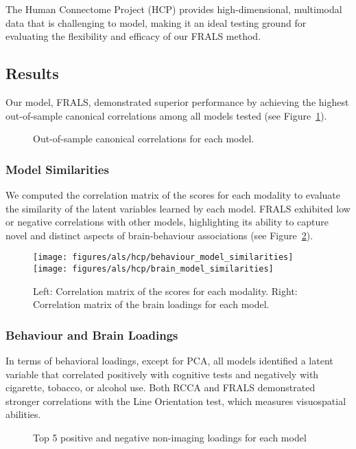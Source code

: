 The Human Connectome Project (HCP) provides high-dimensional, multimodal data that is challenging to model, making it an ideal testing ground for evaluating the flexibility and efficacy of our FRALS method.

\subsection{Results}
Our model, FRALS, demonstrated superior performance by achieving the highest out-of-sample canonical correlations among all models tested (see Figure~\ref{fig:performance}).

\begin{figure}[h]
\centering

\caption{Out-of-sample canonical correlations for each model.}
\label{fig:performance}
\end{figure}

\subsubsection{Model Similarities}
We computed the correlation matrix of the scores for each modality to evaluate the similarity of the latent variables learned by each model.
FRALS exhibited low or negative correlations with other models, highlighting its ability to capture novel and distinct aspects of brain-behaviour associations (see Figure~\ref{fig:similarities}).

\begin{figure}[h]
\centering
\texttt{[image: figures/als/hcp/behaviour\_model\_similarities]}
\texttt{[image: figures/als/hcp/brain\_model\_similarities]}
\caption{Left: Correlation matrix of the scores for each modality. Right: Correlation matrix of the brain loadings for each model.}
\label{fig:similarities}
\end{figure}

\subsubsection{Behaviour and Brain Loadings}
In terms of behavioral loadings, except for PCA, all models identified a latent variable that correlated positively with cognitive tests and negatively with cigarette, tobacco, or alcohol use.
Both RCCA and FRALS demonstrated stronger correlations with the Line Orientation test, which measures visuospatial abilities.

\begin{figure}[h]
\centering

\caption*{Top 5 positive and negative non-imaging loadings for each model}
\label{fig:behaviour}
\end{figure}

